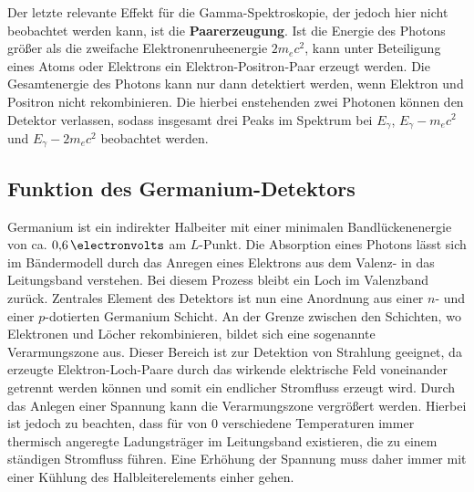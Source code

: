 Der letzte relevante Effekt für die Gamma-Spektroskopie, der jedoch hier nicht beobachtet werden kann, ist die 
\textbf{Paarerzeugung}. Ist die Energie des Photons größer als die zweifache Elektronenruheenergie $2m_ec^2$, 
kann unter Beteiligung eines Atoms oder Elektrons ein Elektron-Positron-Paar erzeugt werden. Die Gesamtenergie 
des Photons kann nur dann detektiert werden, wenn Elektron und Positron nicht rekombinieren. Die hierbei enstehenden 
zwei Photonen können den Detektor verlassen, sodass insgesamt drei Peaks im Spektrum bei $E_\gamma$, $E_\gamma - m_ec^2$ und 
$E_\gamma - 2m_ec^2$ beobachtet werden. 

\subsection{Funktion des Germanium-Detektors}
Germanium ist ein indirekter Halbeiter mit einer minimalen Bandlückenenergie von ca. $\SI{0.6}{\electronvolts}$ am $L$-Punkt. 
Die Absorption eines Photons lässt sich im Bändermodell durch das Anregen eines Elektrons aus dem Valenz- in das 
Leitungsband verstehen. Bei diesem Prozess bleibt ein Loch im Valenzband zurück. Zentrales Element des Detektors ist nun 
eine Anordnung aus einer $n$- und einer $p$-dotierten Germanium Schicht. An der Grenze zwischen den Schichten, wo Elektronen 
und Löcher rekombinieren, bildet sich eine sogenannte Verarmungszone aus. Dieser Bereich ist zur Detektion von Strahlung 
geeignet, da erzeugte Elektron-Loch-Paare durch das wirkende elektrische Feld voneinander getrennt werden können und somit ein 
endlicher Stromfluss erzeugt wird. Durch das Anlegen einer Spannung kann die Verarmungszone vergrößert werden. Hierbei ist jedoch 
zu beachten, dass für von $0$ verschiedene Temperaturen immer thermisch angeregte Ladungsträger im Leitungsband existieren, die 
zu einem ständigen Stromfluss führen. Eine Erhöhung der Spannung muss daher immer mit einer Kühlung des 
Halbleiterelements einher gehen.


